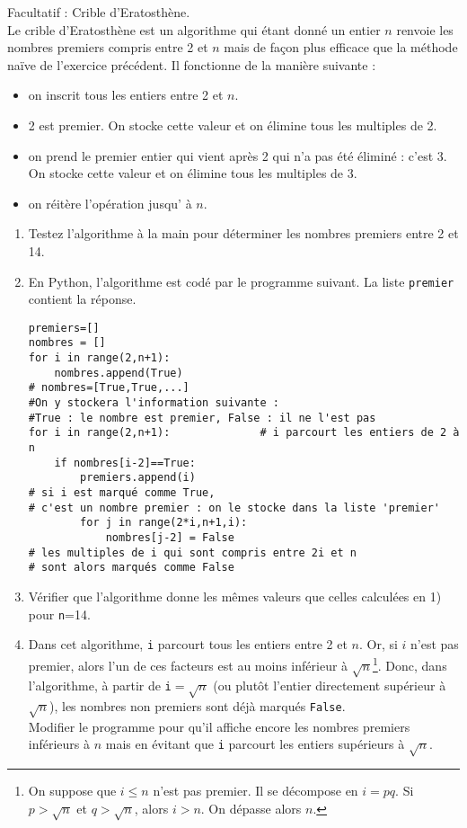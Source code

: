 \begin{exercice}Facultatif : Crible d'Eratosthène.\\
Le crible d'Eratosthène est un algorithme qui étant donné un entier $n$ renvoie les nombres premiers compris entre 2 et $n$ mais de façon plus efficace que la méthode naïve de l'exercice précédent. Il fonctionne de la manière suivante :
\begin{itemize}
\item on inscrit tous les entiers entre 2 et $n$.
\item 2 est premier. On stocke cette valeur et on élimine tous les multiples de 2.
\item on prend le premier entier qui vient après 2 qui n'a pas été éliminé : c'est 3. On stocke cette valeur et  on élimine tous les multiples de 3.
\item on réitère l'opération jusqu' à $n$.
\end{itemize}
\begin{enumerate}
\item Testez l'algorithme à la main pour déterminer les nombres premiers entre 2 et 14.
\item En Python, l'algorithme est codé par le programme suivant. La liste \verb?premier? contient la réponse. 
\begin{verbatim}
premiers=[] 
nombres = []
for i in range(2,n+1):
	nombres.append(True)    
# nombres=[True,True,...] 
#On y stockera l'information suivante : 
#True : le nombre est premier, False : il ne l'est pas
for i in range(2,n+1):              # i parcourt les entiers de 2 à n      
	if nombres[i-2]==True:         
		premiers.append(i)  
# si i est marqué comme True,
# c'est un nombre premier : on le stocke dans la liste 'premier'  		      
		for j in range(2*i,n+1,i): 
			nombres[j-2] = False   
# les multiples de i qui sont compris entre 2i et n   
# sont alors marqués comme False			
\end{verbatim}
\item Vérifier que l'algorithme donne les m\^ emes valeurs que celles calculées en 1) pour \verb?n?=14.
\item Dans cet algorithme, \verb?i? parcourt tous les entiers entre 2 et $n$. Or, si $i$ n'est pas premier, alors l'un de ces facteurs est au moins inférieur à $\sqrt{n}$\footnote{On suppose que $i\leq n$ n'est pas premier. Il se décompose en $i=pq$. Si $p> \sqrt{n}$ et $q>\sqrt{n}$, alors $i>n$. On dépasse alors $n$.}. Donc, dans l'algorithme, à partir de \verb?i?$=\sqrt{n}$ (ou plut\^ ot l'entier directement supérieur à $\sqrt{n}$), les nombres non premiers sont déjà marqués \verb?False?.  \\
Modifier le programme pour qu'il affiche encore les nombres premiers inférieurs à $n$ mais en évitant que \verb?i? parcourt les entiers supérieurs à $\sqrt{n}$.
\end{enumerate}
\end{exercice}



